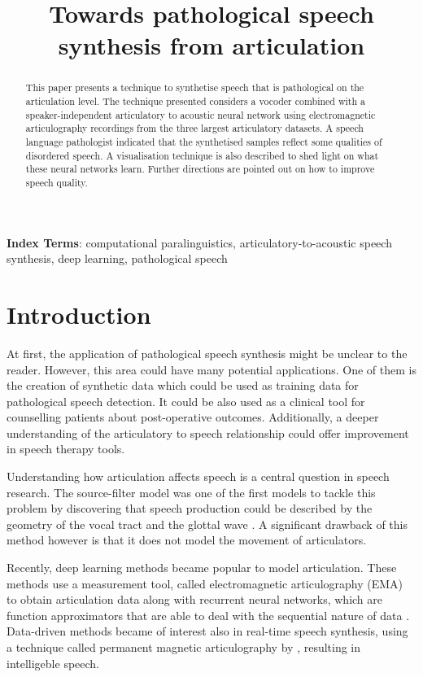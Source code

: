 \documentclass[a4paper]{article}
\title{Towards pathological speech synthesis from articulation}
\begin{document}
\maketitle
% 
\begin{abstract}

  This paper presents a technique to synthetise speech that is pathological on the articulation level.
  The technique presented considers a vocoder combined with a speaker-independent articulatory to acoustic neural network using electromagnetic articulography recordings from the three largest articulatory datasets. A speech language pathologist indicated that the synthetised samples reflect some qualities of disordered speech. A visualisation technique is also described to shed light on what these neural networks learn. Further directions are pointed out on how to improve speech quality.
\end{abstract}
\noindent\textbf{Index Terms}: computational paralinguistics, articulatory-to-acoustic
speech synthesis, deep learning, pathological speech

\section{Introduction}

At first, the application of pathological speech synthesis might be unclear to the reader.
However, this area could have many
potential applications. One of them is the creation of synthetic data which could be
used as training data for pathological speech detection. It could be also used as a
clinical tool for counselling patients about post-operative outcomes. Additionally, a
deeper understanding of the articulatory to speech relationship could offer improvement
in speech therapy tools.

Understanding how articulation affects speech is a central question in speech
research. The source-filter model was one of the first models to tackle this
problem by discovering that speech production could be described by
the geometry of the vocal tract and the glottal wave \cite{Benesty2009} \cite{Fant1981}.
A significant drawback of this method however is that it does not model the movement of articulators.

Recently, deep learning methods became popular
to model articulation. These methods use a measurement tool,
called electromagnetic articulography (EMA) to obtain articulation data 
\cite{Aryal2016} \cite{Taguchi} \cite{Liu2018} along with recurrent
neural networks, which are function approximators that are able to deal with
the sequential nature of data \cite{Hochreiter1997}. Data-driven methods became of interest also
in real-time speech synthesis, using a technique called permanent magnetic articulography
by \cite{Gonzalez2017}, resulting in intelligeble
speech.
\end{document}
